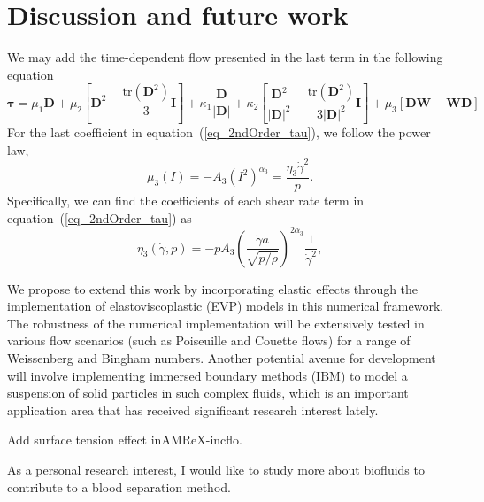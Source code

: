 \section{Discussion and future work}
We may add the time-dependent flow presented in the last term in the following equation
\begin{equation}
  \bm{\tau} =  \mu_1 {\bm D} 
    + \mu_2  \left[ {\bm D}^2  - \frac{\text{tr}\left({\bm D}^2\right)}{3}{\bm I} \right]
   + \kappa_1 \frac{{\bm D}}{|{\bm D}|} 
    + \kappa_2  \left[ \frac{{\bm D}^2}{|{\bm D}|^2}  
    - \frac{\text{tr}\left({\bm D}^2\right)}{3|{\bm D}|^2}{\bm I} \right]
    + \mu_3  \left[ {\bm D}{\bm W} - {\bm W}{\bm D} \right]
  \end{equation}
  For the last coefficient in equation~(\ref{eq_2ndOrder_tau}), we follow the power law, 
\begin{equation}
    \mu_3(I) = -A_3 \left( I^2 \right)^{\alpha_3} = \frac{\eta_3 \dot{\gamma}^2}{p}.
\label{eq_muI3}
\end{equation}
Specifically, we can find the coefficients of each shear rate term in equation~(\ref{eq_2ndOrder_tau}) as
\begin{equation}
     \eta_3 (\dot{\gamma}, p) = 
    -p A_3 
        \left( \frac{\dot{\gamma} a }{\sqrt{p/\rho}}  \right)^{2\alpha_3} 
        \frac{1}{\dot{\gamma}^2},
\label{eq_gr_eta_3}
\end{equation}
\par
We propose to extend this work by incorporating elastic effects through the implementation of elastoviscoplastic (EVP) models in this numerical framework. The robustness of the numerical implementation will be extensively tested in various flow scenarios (such as Poiseuille and Couette flows) for a range of Weissenberg and Bingham numbers.  Another potential avenue for development will involve implementing immersed boundary methods (IBM) to model a suspension of solid particles in such complex fluids, which is an important application area that has received significant research interest lately. 
\par
Add surface tension effect inAMReX-incflo. 
\par 
As a personal research interest, I would like to study more about biofluids to contribute to a blood separation method. 